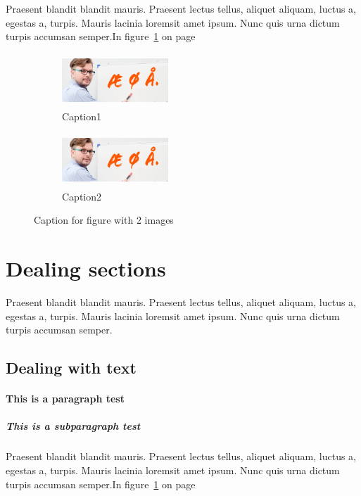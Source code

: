 \documentclass{article}
\begin{document}
Praesent blandit blandit mauris. Praesent
lectus tellus, aliquet aliquam, luctus a, egestas a, turpis. Mauris 
lacinia loremsit amet ipsum. Nunc quis urna dictum turpis accumsan 
semper.In figure~\ref{fig:fig2} on page~\pageref{fig:fig2}

\begin{figure}[h]
\centering
    \begin{subfigure}{0.3\textwidth}
        \includegraphics[width=4cm, height=2cm]{Alphabet41393.jpg}
        \caption{Caption1}
        \label{fig:fig2}
    \end{subfigure}
    \begin{subfigure}{0.3\textwidth}
        \includegraphics[width=4cm, height=2cm]{Alphabet41393.jpg}
        \caption{Caption2}
        \label{fig:fig3}
    \end{subfigure}
    \caption{Caption for figure with 2 images}
\end{figure}
\FloatBarrier

\section{Dealing sections}
Praesent blandit blandit mauris. Praesent
lectus tellus, aliquet aliquam, luctus a, egestas a, turpis. Mauris 
lacinia loremsit amet ipsum. Nunc quis urna dictum turpis accumsan 
semper.
\subsection{Dealing with text}
\paragraph{This is a paragraph test}
\subparagraph{This is a subparagraph test}

Praesent blandit blandit mauris. Praesent
lectus tellus, aliquet aliquam, luctus a, egestas a, turpis. Mauris 
lacinia loremsit amet ipsum. Nunc quis urna dictum turpis accumsan 
semper.In figure~\ref{fig:fig2} on page~\pageref{fig:fig2}
\end{document}
